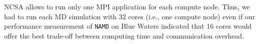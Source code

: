 NCSA allows to run only one MPI application for each compute node. Thus, we
had to run each MD simulation with 32 cores (i.e., one compute node) even if
our performance measurement of \texttt{NAMD} on Blue Waters indicated that 16
cores would offer the best trade-off between computing time and communication
overhead.











